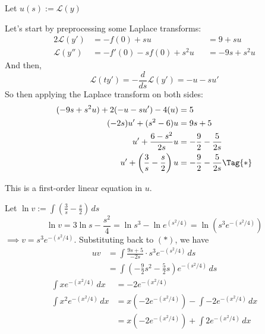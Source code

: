 \begin{compute}
	\def\L{\mathcal L}

	Let $u(s):=\L(y)$

	Let's start by preprocessing some Laplace transforms:
	\begin{alignat*}{2}
		\L(y')  & =-f(0)+su          &  & = 9+su     \\
		\L(y'') & =-f'(0)-sf(0)+s^2u &  & = -9s+s^2u
	\end{alignat*}
	And then,
	$$
		\L(ty')=-\frac{d}{ds}\L(y')=-u-su'
	$$
	So then applying the Laplace transform on both sides:
	\begin{align*}
		(-9s+s^2u)+2(-u-su')-4(u)         & =5                                \\
		(-2s)u'+(s^2-6)u                  & =9s+5                             \\
		u'+\frac{6-s^2}{2s}u              & =-\frac92-\frac5{2s}              \\
    u'+\left(\frac3s-\frac s2\right)u & =-\frac92-\frac5{2s}\Tag{*}
	\end{align*}

	This is a first-order linear equation in $u$.

	Let $\displaystyle\ln v:=\int\left(\frac3s-\frac s2\right)\,ds$
	$$
		\ln v = 3\ln s-\frac{s^2}4
		= \ln s^3-\ln e^{(s^2/4)}
		= \ln (s^3e^{-(s^2/4)})
	$$
	$\implies v=s^3e^{-(s^2/4)}$. Substituting back to $(*)$, we have
	\begin{align*}
		uv & =\int\frac{9s+5}{-2s}\cdot s^3e^{-(s^2/4)}\,ds           \\
		   & =\int\left(-\frac92s^2-\frac5{2}s\right)e^{-(s^2/4)}\,ds
	\end{align*}
	\begin{align*}
		\int xe^{-(x^2/4)}\,dx   & = -2e^{-(x^2/4)}                           \\
		\int x^2e^{-(x^2/4)}\,dx & = x(-2e^{-(x^2/4)})-\int-2e^{-(x^2/4)}\,dx \\
		& = x(-2e^{-(x^2/4)})+\int2e^{-(x^2/4)}\,dx \\
	\end{align*}


\end{compute}
